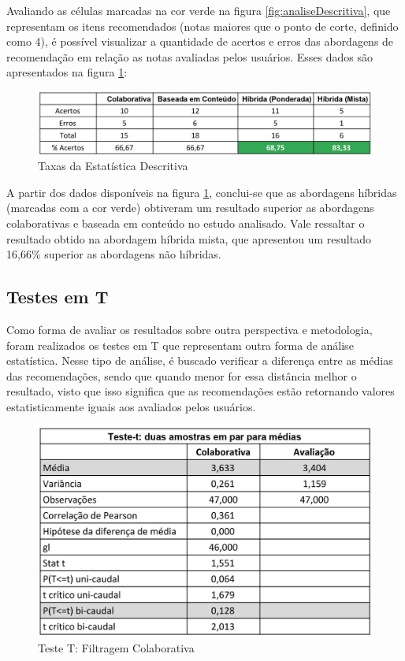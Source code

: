 Avaliando as células marcadas na cor verde na figura \ref{fig:analiseDescritiva}, que representam os itens recomendados (notas maiores que o ponto de corte, definido como 4), é possível visualizar a quantidade de acertos e erros das abordagens de recomendação em relação as notas avaliadas pelos usuários. Esses dados são apresentados na figura \ref{fig:analiseDescritivaTaxas}:

\begin{figure}[H]
	\centering
	\includegraphics[width=.9\linewidth]{imagens/analiseDescritivaTaxas.jpg}
	\caption[Taxas da Estatística Descritiva]{Taxas da Estatística Descritiva}
    \label{fig:analiseDescritivaTaxas}
\end{figure}

A partir dos dados disponíveis na figura \ref{fig:analiseDescritivaTaxas}, conclui-se que as abordagens híbridas (marcadas com a cor verde) obtiveram um resultado superior as abordagens colaborativas e baseada em conteúdo no estudo analisado. Vale ressaltar o resultado obtido na abordagem híbrida mista, que apresentou um resultado 16,66\% superior as abordagens não híbridas.

\subsection{Testes em T}

Como forma de avaliar os resultados sobre outra perspectiva e metodologia, foram realizados os testes em T que representam outra forma de análise estatística. Nesse tipo de análise, é buscado verificar a diferença entre as médias das recomendações, sendo que quando menor for essa distância melhor o resultado, visto que isso significa que as recomendações estão retornando valores estatisticamente iguais aos avaliados pelos usuários.

\begin{figure}[H]
	\centering
	\includegraphics[width=.7\linewidth]{imagens/testeTColaborativa.jpg}
	\caption[Teste T: Filtragem Colaborativa]{Teste T: Filtragem Colaborativa}
    \label{fig:testeTColaborativa}
\end{figure}

